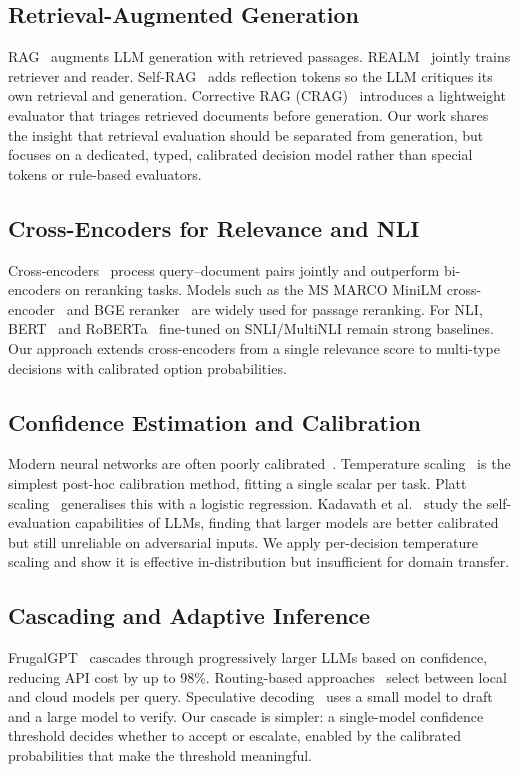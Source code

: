 \documentclass[twocolumn]{ICCKjournal}
\begin{document}
\subsection{Retrieval-Augmented Generation}
RAG~\cite{lewis2020rag} augments LLM generation with retrieved passages. REALM~\cite{guu2020realm} jointly trains retriever and reader. Self-RAG~\cite{asai2024selfrag} adds reflection tokens so the LLM critiques its own retrieval and generation. Corrective RAG (CRAG)~\cite{yan2024corrective} introduces a lightweight evaluator that triages retrieved documents before generation. Our work shares the insight that retrieval evaluation should be separated from generation, but focuses on a dedicated, typed, calibrated decision model rather than special tokens or rule-based evaluators.

\subsection{Cross-Encoders for Relevance and NLI}
Cross-encoders~\cite{nogueira2019passage} process query--document pairs jointly and outperform bi-encoders on reranking tasks. Models such as the MS MARCO MiniLM cross-encoder~\cite{reimers2019sentence} and BGE reranker~\cite{bge_m3} are widely used for passage reranking. For NLI, BERT~\cite{devlin2019bert} and RoBERTa~\cite{liu2019roberta} fine-tuned on SNLI/MultiNLI remain strong baselines. Our approach extends cross-encoders from a single relevance score to multi-type decisions with calibrated option probabilities.

\subsection{Confidence Estimation and Calibration}
Modern neural networks are often poorly calibrated~\cite{guo2017calibration}. Temperature scaling~\cite{guo2017calibration} is the simplest post-hoc calibration method, fitting a single scalar per task. Platt scaling~\cite{platt1999probabilistic} generalises this with a logistic regression. Kadavath et al.~\cite{kadavath2022language} study the self-evaluation capabilities of LLMs, finding that larger models are better calibrated but still unreliable on adversarial inputs. We apply per-decision temperature scaling and show it is effective in-distribution but insufficient for domain transfer.

\subsection{Cascading and Adaptive Inference}
FrugalGPT~\cite{chen2023frugalgpt} cascades through progressively larger LLMs based on confidence, reducing API cost by up to 98\%. Routing-based approaches~\cite{ding2024hybrid} select between local and cloud models per query. Speculative decoding~\cite{leviathan2023fast} uses a small model to draft and a large model to verify. Our cascade is simpler: a single-model confidence threshold decides whether to accept or escalate, enabled by the calibrated probabilities that make the threshold meaningful.
\end{document}
